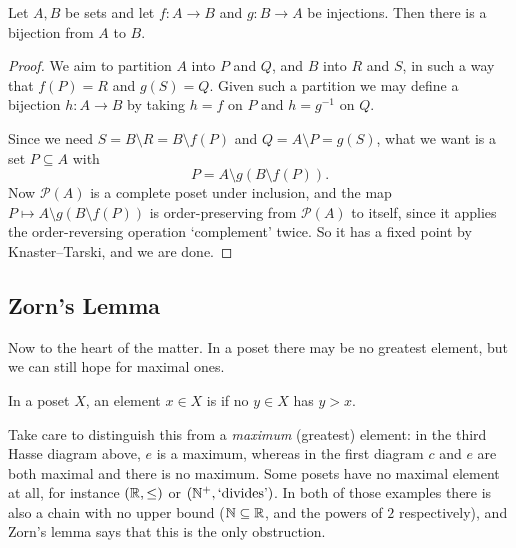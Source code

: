 \documentclass[a4paper]{scrartcl}
\begin{document}
\begin{corollary}\label{cor:csb}
  Let $A, B$ be sets and let $f: A \rightarrow B$ and $g: B \rightarrow A$ be injections. Then there is a bijection from $A$ to $B$.
\end{corollary}
\begin{proof}
  We aim to partition $A$ into $P$ and $Q$, and $B$ into $R$ and $S$, in such a way that $f(P) = R$ and $g(S) = Q$. Given such a partition we may define a bijection $h : A \to B$ by taking $h = f$ on $P$ and $h = g^{-1}$ on $Q$.
  \begin{center}
  \end{center}
  Since we need $S = B\setminus R = B \setminus f(P)$ and $Q = A \setminus P = g(S)$, what we want is a set $P \subseteq A$ with
  $$
    P = A\setminus g(B\setminus f(P)).
  $$
  Now $\mathcal{P}(A)$ is a complete poset under inclusion, and the map $P \mapsto A\setminus g(B\setminus f(P))$ is order-preserving from $\mathcal{P}(A)$ to itself, since it applies the order-reversing operation `complement' twice. So it has a fixed point by Knaster--Tarski, and we are done.
\end{proof}

\subsection{Zorn's Lemma}

Now to the heart of the matter. In a poset there may be no greatest element, but we can still hope for maximal ones.

\begin{definition}
  In a poset $X$, an element $x \in X$ is  if no $y \in X$ has $y > x$.
\end{definition}

Take care to distinguish this from a \emph{maximum} (greatest) element: in the third Hasse diagram above, $e$ is a maximum, whereas in the first diagram $c$ and $e$ are both maximal and there is no maximum. Some posets have no maximal element at all, for instance $(\mathbb{R}, \leq)$ or $(\mathbb{N}^+, \text{`divides'})$. In both of those examples there is also a chain with no upper bound ($\mathbb{N} \subseteq \mathbb{R}$, and the powers of $2$ respectively), and Zorn's lemma says that this is the only obstruction.
\end{document}
